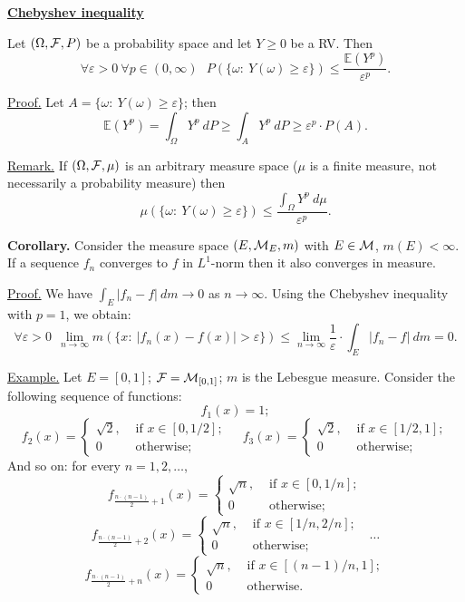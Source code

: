 \documentclass[a4paper,10pt]{article}
\def\EE{\mathbb{E}}
\newcommand{\1}[1]{\mathbf{1}_{\{#1\}}}
\begin{document}
\begin{center}\bf\underline{Chebyshev inequality} \end{center}\vspace{3mm}

Let $(\Omega,{\cal F},P)$ be a probability space and let $Y\ge 0$ be a RV. Then
  $$\forall\varepsilon>0~\forall p\in(0,\infty)~~~P(\{\omega:~Y(\omega)\ge\varepsilon\})\le\frac{\EE(Y^p)}{\varepsilon^p}.$$\vspace{3mm}

\underline{Proof.} Let $A=\{\omega:~ Y(\omega)\ge\varepsilon\}$; then
  $$\EE(Y^p)=\int_\Omega Y^p~dP\ge \int_A Y^p~dP\ge \varepsilon^p\cdot P(A).$$
\blacksquare \vspace{3mm}

\underline{Remark.} If $(\Omega,{\cal F}, \mu)$ is an arbitrary measure space ($\mu$ is a finite measure, not necessarily a probability measure) then
  $$\mu(\{\omega:~ Y(\omega)\ge\varepsilon\})\le \frac{\int_\Omega Y^p~d\mu}{\varepsilon^p}.$$
\vspace{3mm}

{\bf Corollary.} Consider the measure space $(E,{\cal M}_E,m)$ with $E\in{\cal M}$, $m(E)<\infty$. If a sequence $f_n$ converges to $f$ in $L^1$-norm then it also converges in measure.\vspace{3mm}

\underline{Proof.} We have $\int_E |f_n-f|~dm \to 0$ as $n\to\infty$. Using the Chebyshev inequality with $p=1$, we obtain:
  $$\forall\varepsilon>0~~\lim_{n\to\infty} m(\{x:~|f_n(x)-f(x)|>\varepsilon\})\le\lim_{n\to\infty} \frac{1}{\varepsilon}\cdot\int_E|f_n-f|~dm=0.$$
\blacksquare\vspace{3mm}

\underline{Example.} Let $E=[0,1]$; ${\cal F}={\cal M}_{[0,1]}$; $m$ is the Lebesgue measure. Consider the following sequence of functions:
  $$f_1(x)=1;$$
  $$f_2(x)=\left\{\begin{array}{ll} \sqrt{2}, & \mbox{ if } x\in[0,1/2]; \\ 0 & \mbox{ otherwise}; \end{array}\right.~~~~~
f_3(x)=\left\{\begin{array}{ll} \sqrt{2}, & \mbox{ if } x\in[1/2,1]; \\ 0 & \mbox{ otherwise}; \end{array}\right.$$
And so on: for every $n=1,2,\ldots$,
  $$f_{\frac{n\cdot(n-1)}{2}+1}(x)=\left\{\begin{array}{ll} \sqrt{n}, & \mbox{ if } x\in[0,1/n]; \\ 0 & \mbox{ otherwise}; \end{array}\right.$$
  $$f_{\frac{n\cdot(n-1)}{2}+2}(x)=\left\{\begin{array}{ll} \sqrt{n}, & \mbox{ if } x\in[1/n,2/n]; \\ 0 & \mbox{ otherwise}; \end{array}\right.~~~\ldots$$
  $$f_{\frac{n\cdot(n-1)}{2}+n}(x)=\left\{\begin{array}{ll} \sqrt{n}, & \mbox{ if } x\in[(n-1)/n,1]; \\ 0 & \mbox{ otherwise}. \end{array}\right.$$
\end{document}
